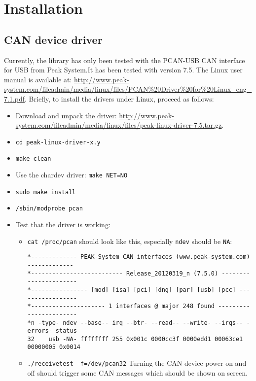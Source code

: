 \chapter{Installation}
\label{chap:installation}

\section{CAN device driver}

Currently, the library has only been tested with the PCAN-USB CAN interface for USB from Peak System.It has been tested with version 7.5. The Linux user manual is available at: \url{http://www.peak-system.com/fileadmin/media/linux/files/PCAN%20Driver%20for%20Linux_eng_7.1.pdf}. Briefly, to install the drivers under Linux, proceed as follows:
  \begin{itemize}
  \item Download and unpack the driver: \url{http://www.peak-system.com/fileadmin/media/linux/files/peak-linux-driver-7.5.tar.gz}.
  \item \texttt{cd peak-linux-driver-x.y}
  \item \texttt{make clean}
  \item Use the chardev driver: \texttt{make NET=NO}
  \item \texttt{sudo make install}
  \item \texttt{/sbin/modprobe pcan}


  \item Test that the driver is working:
    \begin{itemize}
    \item \texttt{cat /proc/pcan} should look like this, especially \texttt{ndev} should be \texttt{NA}:
{\scriptsize
\begin{verbatim}
*------------- PEAK-System CAN interfaces (www.peak-system.com) -------------
*-------------------------- Release_20120319_n (7.5.0) ----------------------
*---------------- [mod] [isa] [pci] [dng] [par] [usb] [pcc] -----------------
*--------------------- 1 interfaces @ major 248 found -----------------------
*n -type- ndev --base-- irq --btr- --read-- --write- --irqs-- -errors- status
32    usb -NA- ffffffff 255 0x001c 0000cc3f 0000edd1 00063ce1 00000005 0x0014
\end{verbatim}}
\item \texttt{./receivetest -f=/dev/pcan32} Turning the CAN device power on and off should trigger some CAN messages which should be shown on screen.
    \end{itemize}
  \end{itemize}

